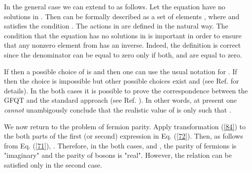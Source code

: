 \documentclass[a4paper,12pt]{article}%
\begin{document}
In the general case we can extend \coordHE{} to \coordHE{} as 
follows. Let the equation
\coordHE{}  \coordHE{} have no solutions in \coordHE{}.
Then \coordHE{} can be formally described as a set of
elements \coordHE{}, where \coordHE{} and \myHighlight{$\kappa$}\coordHE{} 
satisfies the condition \coordHE{}. The actions in
\coordHE{} are defined in the natural way. The condition
that the equation \coordHE{} has no solutions in 
\coordHE{} is important in order to ensure that any nonzero 
element from \coordHE{} has an inverse.
Indeed, the definition 
\coordHE{} is correct 
since the denominator can be equal to zero only if both,
\coordHE{} and \coordHE{} are equal to zero. 
  
If \coordHE{} then a possible choice of \coordHE{} is
\coordHE{} and then one can use the usual notation \coordHE{} for 
\myHighlight{$\kappa$}\coordHE{}. If \coordHE{} then the choice \coordHE{}
is impossible but other possible choices exist and
\coordHE{} (see Ref.
\cite{lev2} for details). In the both cases it is 
possible to prove the correspondence between the GFQT and 
the standard approach (see Ref. \cite{lev2}). In other
words, at present one {\it cannot} unambigously conclude that
the realistic value of \coordHE{} is only such that 
\coordHE{}.

We now return to the problem of fermion parity. Apply
transformation (\ref{84}) to the both parts
of the first (or second) expression in Eq. (\ref{72}).
Then, as follows from Eq. (\ref{71}), 
\coordHE{}. Therefore, in the both
cases, \coordHE{}  and \coordHE{}, the
parity of fermions is "imaginary" and the parity of bosons
is "real". However, the relation \coordHE{}
can be satisfied only in the second case. 
\end{document}
